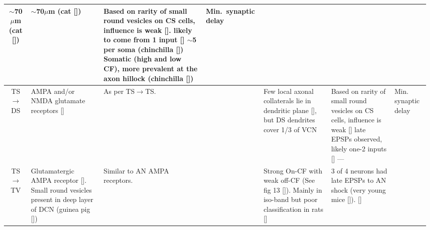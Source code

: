 \begin{longtable}{cYYYYYY}
$\sim$70$\mu$m (cat []) 
                                & %
$\sim$70$\mu$m (cat []) 
                                & %
Based on rarity of small round vesicles on CS cells, influence is weak []. 
likely to come from 1 input []                     
$\sim$5 per soma  (chinchilla [])
Somatic (high and low CF), more prevalent at the axon hillock   (chinchilla [])
                                & %
Min.\ synaptic delay 
\\ \midrule
TS\ensuremath{\rightarrow}DS                        
                                & %
AMPA and/or NMDA glutamate receptors []  
                                & As per TS\ensuremath{\rightarrow}TS.
                                & %
                                & %
Few local axonal collaterals lie in dendritic plane [], but DS dendrites cover 1/3 of VCN
                                & 
Based on rarity of small round vesicles on CS cells, influence is weak [] late EPSPs observed,
likely one-2 inputs [] 
---                                     
                                & 
Min. synaptic delay \\ \midrule
TS\ensuremath{\rightarrow}TV                        
                                & %
Glutamatergic AMPA receptor  [].
Small round vesicles present in deep layer of DCN (guinea pig [])
                                & 
Similar to AN AMPA receptors.        
                                & %
                                & %
Strong On-CF with weak off-CF  (See fig 13 []). 
Mainly in iso-band but poor classification in rats []         
                                & %
3 of 4 neurons had late EPSPs to AN shock (very young mice []).
[] 

\end{longtable}

